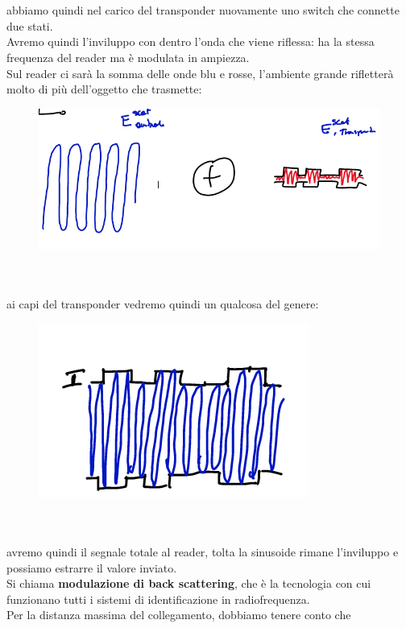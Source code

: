\documentclass[oneside, 12pt]{extbook}
\begin{document}
\\\\abbiamo quindi nel carico del transponder nuovamente uno switch che connette due stati.\\Avremo quindi l'inviluppo con dentro l'onda che viene riflessa: ha la stessa frequenza del reader ma è modulata in ampiezza.\\Sul reader ci sarà la somma delle onde blu e rosse, l'ambiente grande rifletterà molto di più dell'oggetto che trasmette:\\
\begin{figure}[!h]
	\includegraphics[scale=0.3]{immagini/onda_verso_reader.png}
\end{figure}
\\\\ai capi del transponder vedremo quindi un qualcosa del genere:\\
\begin{figure}[!h]
	\includegraphics[scale=0.3]{immagini/ris_capi_transp.png}
\end{figure}
\\\\avremo quindi il segnale totale al reader, tolta la sinusoide rimane l'inviluppo e possiamo estrarre il valore inviato.\\Si chiama \textbf{modulazione di back scattering}, che è la tecnologia con cui funzionano tutti i sistemi di identificazione in radiofrequenza.\\Per la distanza massima del collegamento, dobbiamo tenere conto che 
\end{document}
